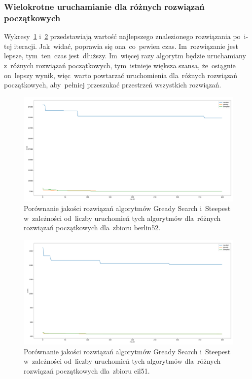 \subsubsection{Wielokrotne uruchamianie dla różnych rozwiązań początkowych}

Wykresy~\ref{fig:more_berlin} i~\ref{fig:more_eil} przedstawiają wartość najlepszego znalezionego rozwiązania po~i-tej iteracji. Jak~widać, poprawia się ona~co~pewien czas. Im~rozwiązanie jest lepsze, tym~ten~czas jest~dłuższy. Im~więcej razy algorytm będzie uruchamiany z~różnych rozwiązań początkowych, tym~istnieje większa szansa, że~osiągnie on~lepszy wynik, więc~warto powtarzać uruchomienia dla~różnych rozwiązań początkowych, aby~pełniej przeszukać przestrzeń wszystkich rozwiązań.

\begin{figure}
\begin{center}
\includegraphics[width=1.0\textwidth]{graphs/multi_start_scoreberlin52.pdf}
\end{center}
\caption{Porównanie jakości rozwiązań algorytmów Gready Search i~Steepest w~zależności od~liczby uruchomień tych algorytmów dla~różnych rozwiązań początkowych dla~zbioru berlin52.}
\label{fig:more_berlin}
\end{figure}

\begin{figure}
\begin{center}
\includegraphics[width=1.0\textwidth]{graphs/multi_start_scoreeil51.pdf}
\end{center}
\caption{Porównanie jakości rozwiązań algorytmów Gready Search i~Steepest w~zależności od~liczby uruchomień tych algorytmów dla~różnych rozwiązań początkowych dla~zbioru eil51.}
\label{fig:more_eil}
\end{figure}


